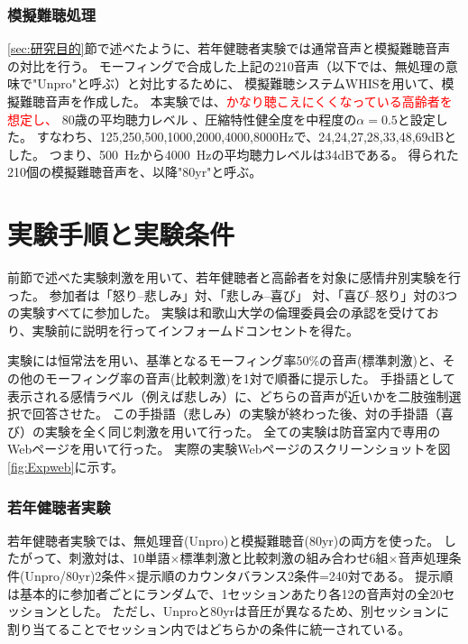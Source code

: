 \subsubsection{模擬難聴処理}

\ref{sec:研究目的}節で述べたように、若年健聴者実験では通常音声と模擬難聴音声の対比を行う。
モーフィングで合成した上記の210音声（以下では、無処理の意味で"Unpro"と呼ぶ）と対比するために、
模擬難聴システムWHIS\cite{irino2023hearing}を用いて、模擬難聴音声を作成した。
本実験では、\textcolor{red}{かなり聴こえにくくなっている高齢者を想定し、}
80歳の平均聴力レベル \cite{tsuiki2002nihon_Jpn}、圧縮特性健全度を中程度の$\alpha=0.5$と設定した。
すなわち、125,250,500,1000,2000,4000,8000Hzで、24,24,27,28,33,48,69dBとした。
つまり、500~Hzから4000~Hzの平均聴力レベルは34dBである。
得られた210個の模擬難聴音声を、以降"80yr"と呼ぶ。


\newpage
\section{実験手順と実験条件}
\label{sec:ExpCondition}
前節で述べた実験刺激を用いて、若年健聴者と高齢者を対象に感情弁別実験を行った。
参加者は「怒り--悲しみ」対、「悲しみ--喜び」 対、「喜び--怒り」対の3つの実験すべてに参加した。
実験は和歌山大学の倫理委員会の承認を受けており、実験前に説明を行ってインフォームドコンセントを得た。

実験には恒常法を用い、基準となるモーフィング率50\%の音声(標準刺激)と、その他のモーフィング率の音声(比較刺激)を1対で順番に提示した。
手掛語として表示される感情ラベル（例えば悲しみ）に、どちらの音声が近いかを二肢強制選択で回答させた。
この手掛語（悲しみ）の実験が終わった後、対の手掛語（喜び）の実験を全く同じ刺激を用いて行った。
全ての実験は防音室内で専用のWebページ\cite{AMLAB_WebOpen}を用いて行った。
実際の実験Webページのスクリーンショットを図\ref{fig:Expweb}に示す。


\subsubsection{若年健聴者実験}

若年健聴者実験では、無処理音(Unpro)と模擬難聴音(80yr)の両方を使った。
したがって、刺激対は、10単語$\times$標準刺激と比較刺激の組み合わせ6組$\times$音声処理条件(Unpro/80yr)2条件$\times$提示順のカウンタバランス2条件=240対である。
提示順は基本的に参加者ごとにランダムで、1セッションあたり各12の音声対の全20セッションとした。
ただし、Unproと80yrは音圧が異なるため、別セッションに割り当てることでセッション内ではどちらかの条件に統一されている。

